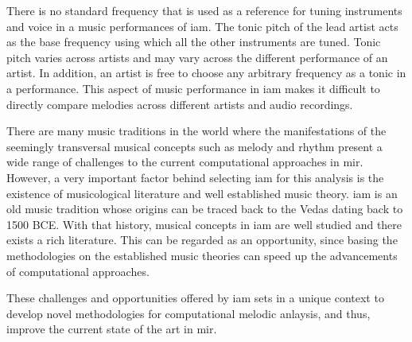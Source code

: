 

There is no standard frequency that is used as a reference for tuning instruments and voice in a music performances of \gls{iam}. The tonic pitch of the lead artist acts as the base frequency using which all the other instruments are tuned. Tonic pitch varies across artists and may vary across the different performance of an artist. In addition, an artist is free to choose any arbitrary frequency as a tonic in a performance. This aspect of music performance in \gls{iam} makes it difficult to directly compare melodies across different artists and audio recordings. 

There are many music traditions in the world where the manifestations of the seemingly transversal musical concepts such as melody and rhythm present a wide range of challenges to the current computational approaches in \gls{mir}. However, a very important factor behind selecting \gls{iam} for this analysis is the existence of musicological literature and well established music theory. \gls{iam} is an old music tradition whose origins can be traced back to the Vedas dating back to 1500 BCE. With that history, musical concepts in \gls{iam} are well studied and there exists a rich literature. This can be regarded as an opportunity, since basing the methodologies on the established music theories can speed up the advancements of computational approaches. 






These challenges and opportunities offered by \gls{iam} sets in a unique context to develop novel methodologies for computational melodic anlaysis, and thus, improve the current state of the art in \gls{mir}. 






